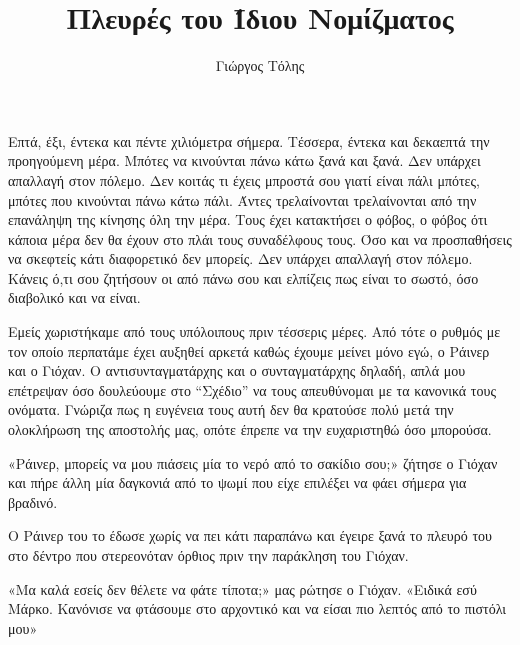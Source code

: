 \documentclass[12pt,twoside, openany]{book}
\begin{document}
\frontmatter

\title{
\Huge Πλευρές του Ίδιου Νομίζματος\\[0.5em]
}
\author{Γιώργος Τόλης}
\date{}
\mainmatter


\maketitle

\cleardoublepage

\tableofcontents

\cleardoublepage

\chapter{}

Επτά, έξι, έντεκα και πέντε χιλιόμετρα σήμερα. Τέσσερα, έντεκα και δεκαεπτά την προηγούμενη μέρα. Μπότες να κινούνται πάνω κάτω ξανά και ξανά. Δεν υπάρχει απαλλαγή στον πόλεμο. Δεν κοιτάς τι έχεις μπροστά σου γιατί είναι πάλι μπότες, μπότες που κινούνται πάνω κάτω πάλι. Άντες τρελαίνονται τρελαίνονται από την επανάληψη της κίνησης όλη την μέρα. Τους έχει κατακτήσει ο φόβος, ο φόβος ότι κάποια μέρα δεν θα έχουν στο πλάι τους συναδέλφους τους. Όσο και να προσπαθήσεις να σκεφτείς κάτι διαφορετικό δεν μπορείς. Δεν υπάρχει απαλλαγή στον πόλεμο. Κάνεις ό,τι σου ζητήσουν οι από πάνω σου και ελπίζεις πως είναι το σωστό, όσο διαβολικό και να είναι.

Εμείς χωριστήκαμε από τους υπόλοιπους πριν τέσσερις μέρες. Από τότε ο ρυθμός με τον οποίο περπατάμε έχει αυξηθεί αρκετά καθώς έχουμε μείνει μόνο εγώ, ο Ράινερ και ο Γιόχαν. Ο αντισυνταγματάρχης και ο συνταγματάρχης δηλαδή, απλά μου επέτρεψαν όσο δουλεύουμε στο “Σχέδιο” να τους απευθύνομαι με τα κανονικά τους ονόματα. Γνώριζα πως η ευγένεια τους αυτή δεν θα κρατούσε πολύ μετά την ολοκλήρωση της αποστολής μας, οπότε έπρεπε να την ευχαριστηθώ όσο μπορούσα.

«Ράινερ, μπορείς να μου πιάσεις μία το νερό από το σακίδιο σου;» ζήτησε ο Γιόχαν και πήρε άλλη μία δαγκονιά από το ψωμί που είχε επιλέξει να φάει σήμερα για βραδινό.

Ο Ράινερ του το έδωσε χωρίς να πει κάτι παραπάνω και έγειρε ξανά το πλευρό του στο δέντρο που στερεονόταν όρθιος πριν την παράκληση του Γιόχαν.

«Μα καλά εσείς δεν θέλετε να φάτε τίποτα;» μας ρώτησε ο Γιόχαν. «Ειδικά εσύ Μάρκο. Κανόνισε να φτάσουμε στο αρχοντικό και να είσαι πιο λεπτός από το πιστόλι μου»
\end{document}
